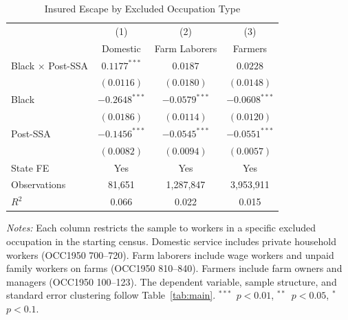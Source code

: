 \begin{table}[t]
\centering
\caption{Insured Escape by Excluded Occupation Type}
\label{tab:occtype}
\begin{tabular}{lccc}
\hline\hline
 & (1) & (2) & (3) \\
 & Domestic & Farm Laborers & Farmers \\
\hline
Black $\times$ Post-SSA & $0.1177^{***}$ & $0.0187$ & $0.0228$ \\
 & $(0.0116)$ & $(0.0180)$ & $(0.0148)$ \\
\addlinespace
Black & $-0.2648^{***}$ & $-0.0579^{***}$ & $-0.0608^{***}$ \\
 & $(0.0186)$ & $(0.0114)$ & $(0.0120)$ \\
\addlinespace
Post-SSA & $-0.1456^{***}$ & $-0.0545^{***}$ & $-0.0551^{***}$ \\
 & $(0.0082)$ & $(0.0094)$ & $(0.0057)$ \\
\hline
State FE & Yes & Yes & Yes \\
Observations & 81,651 & 1,287,847 & 3,953,911 \\
$R^2$ & 0.066 & 0.022 & 0.015 \\
\hline\hline
\end{tabular}
\begin{tablenotes}
\small
\item \textit{Notes:} Each column restricts the sample to workers in a specific excluded occupation in the starting census. Domestic service includes private household workers (OCC1950 700--720). Farm laborers include wage workers and unpaid family workers on farms (OCC1950 810--840). Farmers include farm owners and managers (OCC1950 100--123). The dependent variable, sample structure, and standard error clustering follow Table~\ref{tab:main}. $^{***}$~$p<0.01$, $^{**}$~$p<0.05$, $^{*}$~$p<0.1$.
\end{tablenotes}
\end{table}
